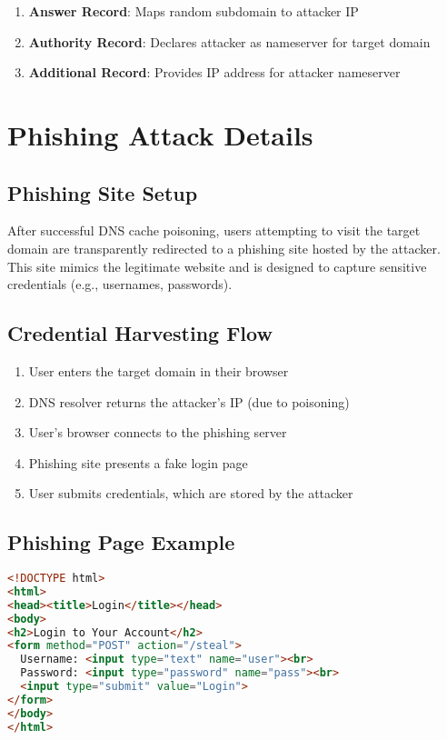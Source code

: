 \documentclass[12pt,a4paper]{article}
\begin{document}
\begin{enumerate}
    \item \textbf{Answer Record}: Maps random subdomain to attacker IP
    \item \textbf{Authority Record}: Declares attacker as nameserver for target domain
    \item \textbf{Additional Record}: Provides IP address for attacker nameserver
\end{enumerate}

\section{Phishing Attack Details}

\subsection{Phishing Site Setup}

After successful DNS cache poisoning, users attempting to visit the target domain are transparently redirected to a phishing site hosted by the attacker. This site mimics the legitimate website and is designed to capture sensitive credentials (e.g., usernames, passwords).

\subsection{Credential Harvesting Flow}

\begin{enumerate}
    \item User enters the target domain in their browser
    \item DNS resolver returns the attacker's IP (due to poisoning)
    \item User's browser connects to the phishing server
    \item Phishing site presents a fake login page
    \item User submits credentials, which are stored by the attacker
\end{enumerate}

\subsection{Phishing Page Example}

\begin{lstlisting}[language=HTML,caption=Example Phishing Login Page]
<!DOCTYPE html>
<html>
<head><title>Login</title></head>
<body>
<h2>Login to Your Account</h2>
<form method="POST" action="/steal">
  Username: <input type="text" name="user"><br>
  Password: <input type="password" name="pass"><br>
  <input type="submit" value="Login">
</form>
</body>
</html>
\end{lstlisting}
\end{document}
